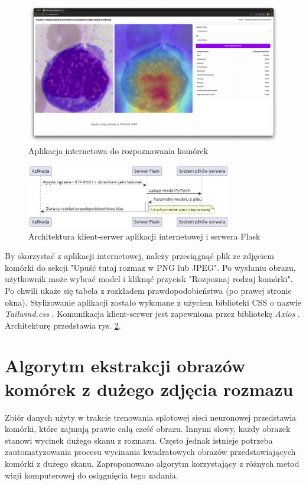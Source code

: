 \begin{figure}
    \centering
    \includegraphics[width=\textwidth]{app}
    \caption{Aplikacja internetowa do rozpoznawania komórek}
    \label{fig:ui}
\end{figure}


\begin{figure}
    \centering
    \includegraphics[width=0.8\textwidth]{arch}
    \caption{Architektura klient-serwer aplikacji internetowej i serwera Flask}
    \label{fig:arch}
\end{figure}

By skorzystać z aplikacji internetowej, należy przeciągnąć plik ze zdjęciem komórki do sekcji "Upuść tutaj rozmaz w PNG lub JPEG".
Po wysłaniu obrazu, użytkownik może wybrać model i kliknąć przycisk "Rozpoznaj rodzaj komórki".
Po chwili ukaże się tabela z rozkładem prawdopodobieństwa (po prawej stronie okna).
Stylizowanie aplikacji zostało wykonane z użyciem biblioteki CSS o nazwie \textit{Tailwind.css} \cite{tailwind}.
Komunikacja klient-serwer jest zapewniona przez bibliotekę \textit{Axios} \cite{axios}.
Architekturę przedstawia rys. \ref{fig:arch}.


\section{Algorytm ekstrakcji obrazów komórek z dużego zdjęcia rozmazu}\label{sec:kwadraty}

Zbiór danych użyty w trakcie trenowania splotowej sieci neuronowej przedstawia komórki, które zajmują prawie całą cześć obrazu.
Innymi słowy, każdy obrazek stanowi wycinek dużego skanu z rozmazu.
Często jednak istnieje potrzeba zautomatyzowania procesu wycinania kwadratowych obrazów przedstawiających komórki z dużego skanu.
Zaproponowano algorytm korzystający z różnych metod wizji komputerowej do osiągnięcia tego zadania.

